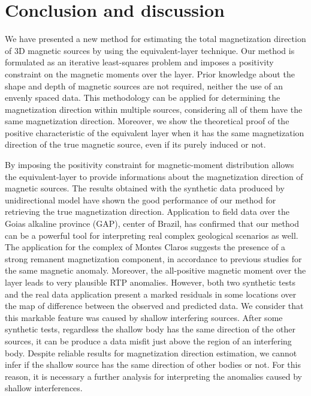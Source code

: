 \section{Conclusion and discussion}
\label{sec:conclusion}

We have presented a new method for estimating the total magnetization direction of 3D magnetic sources by using the equivalent-layer technique. Our method is formulated as an iterative least-squares problem and imposes a positivity constraint on the magnetic moments over the layer. Prior knowledge about the shape and depth of magnetic sources are not required, neither the use of an envenly spaced data. This methodology can be applied for determining the magnetization direction within multiple sources, considering all of them have the same magnetization direction. Moreover, we show the theoretical proof of the positive characteristic of the equivalent layer when it has the same magnetization direction of the true magnetic source, even if its purely induced or not.

By imposing the positivity constraint for magnetic-moment distribution allows the equivalent-layer to provide informations about the magnetization direction of magnetic sources. The results obtained with the synthetic data produced by unidirectional model have shown the good performance of our method for retrieving the true magnetization direction. Application to field data over the Goias alkaline province (GAP), center of Brazil, has confirmed that our method can be a powerful tool for interpreting real complex geological scenarios as well. The application for the complex of Montes Claros suggests the presence of a strong remanent magnetization component, in accordance to previous studies for the same magnetic anomaly. Moreover, the all-positive magnetic moment over the layer leads to very plausible RTP anomalies. However, both two synthetic tests and the real data application present a marked residuals in some locations over the map of difference between the observed and predicted data. We consider that this markable feature was caused by shallow interfering sources. After some synthetic tests, regardless the shallow body has the same direction of the other sources, it can be produce a data misfit just above the region of an interfering body. Despite reliable results for magnetization direction estimation, we cannot infer if the shallow source has the same direction of other bodies or not. For this reason, it is necessary a further analysis for interpreting the anomalies caused by shallow interferences.  
